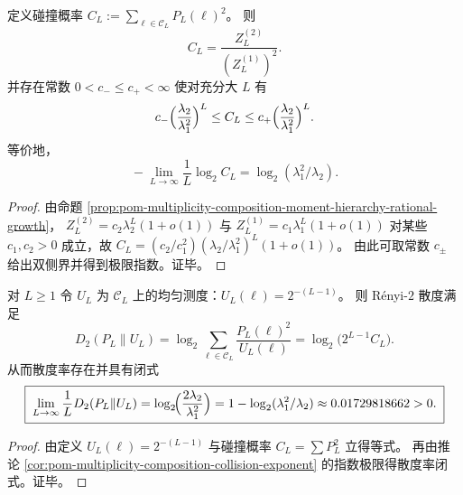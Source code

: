 \begin{corollary}[碰撞概率的指数律与碰撞指数]\label{cor:pom-multiplicity-composition-collision-exponent}
定义碰撞概率
\(
C_L:=\sum_{\boldsymbol{\ell}\in\mathcal{C}_L}P_L(\boldsymbol{\ell})^2
\)。
则
\[
\boxed{\;C_L=\frac{Z_L^{(2)}}{(Z_L^{(1)})^2}.\;}
\]
并存在常数 \(0<c_-\le c_+<\infty\) 使对充分大 \(L\) 有
\[
c_-\Bigl(\frac{\lambda_2}{\lambda_1^2}\Bigr)^L
\le C_L\le
c_+\Bigl(\frac{\lambda_2}{\lambda_1^2}\Bigr)^L.
\]
等价地，
\[
\boxed{\;-\lim_{L\to\infty}\frac{1}{L}\log_2 C_L=\log_2(\lambda_1^2/\lambda_2).\;}
\]
\end{corollary}
\begin{proof}
由命题 \ref{prop:pom-multiplicity-composition-moment-hierarchy-rational-growth}，
\(
Z_L^{(2)}=c_2\lambda_2^L(1+o(1))
\)
与
\(
Z_L^{(1)}=c_1\lambda_1^L(1+o(1))
\)
对某些 \(c_1,c_2>0\) 成立，故
\(
C_L=(c_2/c_1^2)(\lambda_2/\lambda_1^2)^L(1+o(1))
\)。
由此可取常数 \(c_\pm\) 给出双侧界并得到极限指数。证毕。
\end{proof}

\begin{corollary}\label{cor:pom-multiplicity-composition-renyi2-divergence-to-uniform}
对 \(L\ge 1\) 令 \(U_L\) 为 \(\mathcal{C}_L\) 上的均匀测度：\(U_L(\boldsymbol{\ell})=2^{-(L-1)}\)。
则 Rényi-\(2\) 散度满足
\[
D_2(P_L\|U_L)
=\log_2\sum_{\boldsymbol{\ell}\in\mathcal{C}_L}\frac{P_L(\boldsymbol{\ell})^2}{U_L(\boldsymbol{\ell})}
=\log_2\bigl(2^{L-1}C_L\bigr).
\]
从而散度率存在并具有闭式
\[
\boxed{\;
\lim_{L\to\infty}\frac{1}{L}D_2(P_L\|U_L)
=\log_2\!\Bigl(\frac{2\lambda_2}{\lambda_1^2}\Bigr)
=1-\log_2(\lambda_1^2/\lambda_2)\approx 0.01729818662>0.\;}
\]
\end{corollary}
\begin{proof}
由定义 \(U_L(\boldsymbol{\ell})=2^{-(L-1)}\) 与碰撞概率 \(C_L=\sum P_L^2\) 立得等式。
再由推论 \ref{cor:pom-multiplicity-composition-collision-exponent} 的指数极限得散度率闭式。证毕。
\end{proof}

